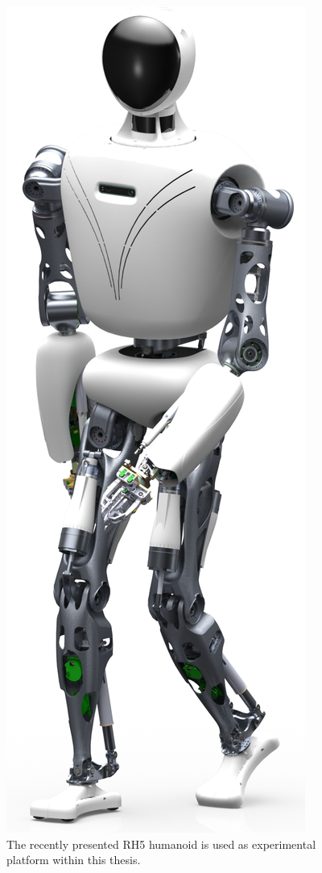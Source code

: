 \begin{figure}[h!]
\centering	
\includegraphics[width=.25\textwidth]{img/rh5_robot.png}
\caption{The recently presented RH5 humanoid is used as experimental platform within this thesis.}
\label{img:rh5_robot}
\end{figure} 

